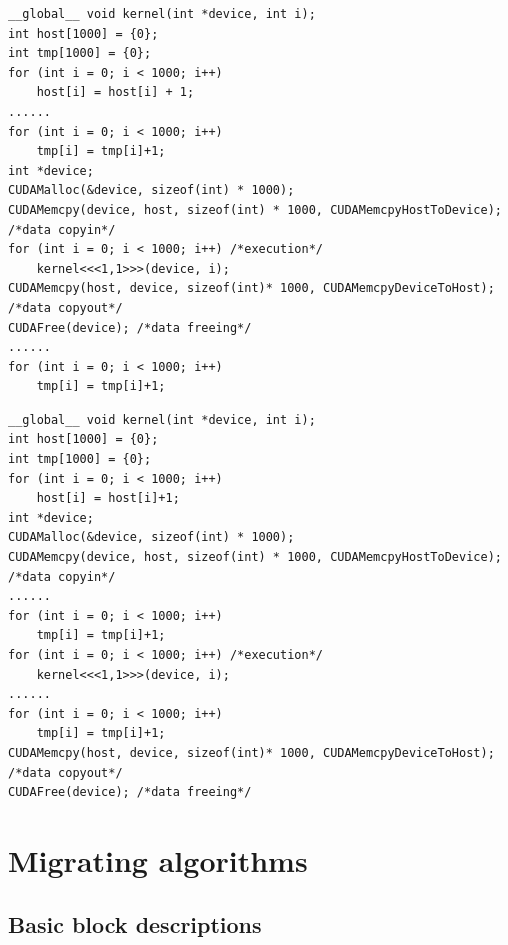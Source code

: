 \documentclass[10pt,conference]{IEEEtran}
\begin{document}
\begin{lstlisting}[label=Listing1,caption=Initial CUDA code]
__global__ void kernel(int *device, int i);
int host[1000] = {0};
int tmp[1000] = {0};
for (int i = 0; i < 1000; i++)
    host[i] = host[i] + 1;
......
for (int i = 0; i < 1000; i++)
    tmp[i] = tmp[i]+1;
int *device;
CUDAMalloc(&device, sizeof(int) * 1000);
CUDAMemcpy(device, host, sizeof(int) * 1000, CUDAMemcpyHostToDevice); /*data copyin*/
for (int i = 0; i < 1000; i++) /*execution*/
    kernel<<<1,1>>>(device, i);
CUDAMemcpy(host, device, sizeof(int)* 1000, CUDAMemcpyDeviceToHost); /*data copyout*/
CUDAFree(device); /*data freeing*/
......
for (int i = 0; i < 1000; i++)
    tmp[i] = tmp[i]+1;
\end{lstlisting}

\begin{lstlisting}[label=Listing2,caption=After migration of data transfer operations]
__global__ void kernel(int *device, int i);
int host[1000] = {0};
int tmp[1000] = {0};
for (int i = 0; i < 1000; i++)
    host[i] = host[i]+1;
int *device;
CUDAMalloc(&device, sizeof(int) * 1000);
CUDAMemcpy(device, host, sizeof(int) * 1000, CUDAMemcpyHostToDevice); /*data copyin*/
......
for (int i = 0; i < 1000; i++)
    tmp[i] = tmp[i]+1;
for (int i = 0; i < 1000; i++) /*execution*/
    kernel<<<1,1>>>(device, i);
......
for (int i = 0; i < 1000; i++)
    tmp[i] = tmp[i]+1;
CUDAMemcpy(host, device, sizeof(int)* 1000, CUDAMemcpyDeviceToHost); /*data copyout*/
CUDAFree(device); /*data freeing*/
\end{lstlisting}

\section{Migrating algorithms}

\subsection{Basic block descriptions}
\end{document}
